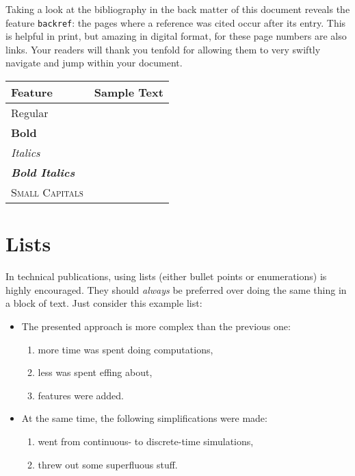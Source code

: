 Taking a look at the bibliography in the back matter of this document reveals the feature \verb|backref|: the pages where a reference was cited occur after its entry.
This is helpful in print, but amazing in digital format, for these page numbers are also links.
Your readers will thank you tenfold for allowing them to very swiftly navigate and jump within your document.
\begin{table}
	{%
		\sffamily
		\begin{tabular}{@{}ll@{}}%
		\toprule
			Feature & Sample Text\\
		\midrule
			Regular & \sampletext\\
			\textbf{Bold} & \textbf{\sampletext}\\
			\textit{Italics} & \textit{\sampletext}\\
			\textbf{\textit{Bold Italics}} & \textbf{\textit{\sampletext}}\\
			\textsc{Small Capitals} & \textsc{\sampletext}\\
		\bottomrule
		\end{tabular}
	}%
\end{table}
\section{Lists}
In technical publications, using lists (either bullet points or enumerations) is highly encouraged.
They should \emph{always} be preferred over doing the same thing in a block of text.
Just consider this example list:
\begin{itemize}
	\item The presented approach is more complex than the previous one:
	\begin{enumerate}
		\item more time was spent doing computations,
		\item less was spent effing about,
		\item features were added.
	\end{enumerate}
	\item At the same time, the following simplifications were made:
	\begin{enumerate}
		\item went from continuous- to discrete-time simulations,
		\item threw out some superfluous stuff.
	\end{enumerate}
\end{itemize}

